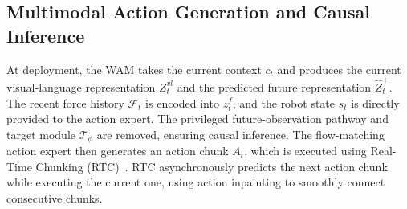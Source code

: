 \documentclass{article} %
\begin{document}
\subsection{Multimodal Action Generation and Causal Inference}




At deployment, the WAM takes the current context $c_t$ and produces the
current visual-language representation $Z_t^{vl}$ and the predicted future
representation $\hat{Z}_t^+$. The recent force history $\mathcal{F}_t$ is
encoded into $z_t^f$, and the robot state $s_t$ is directly provided to the
action expert. The privileged future-observation pathway and target module
$\mathcal{T}_{\phi}$ are removed, ensuring causal inference. The flow-matching
action expert then generates an action chunk $A_t$, which is executed using
Real-Time Chunking (RTC)~\cite{black2025realtimeexecutionactionchunking}.
RTC asynchronously predicts the next action chunk while executing the current
one, using action inpainting to smoothly connect consecutive chunks. 
\end{document}
